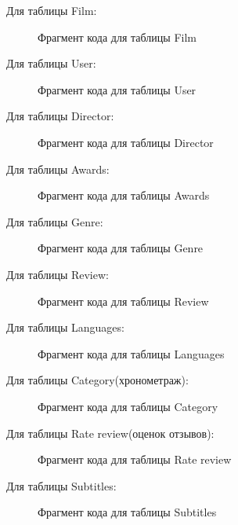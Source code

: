 Для таблицы Film:
\begin{figure} [H]
    \caption{Фрагмент кода для таблицы Film}
    \label{film}
\end{figure}

Для таблицы User:
\begin{figure} [H]
    \caption{Фрагмент кода для таблицы User}
\end{figure}

Для таблицы Director:
\begin{figure} [H]
    \caption{Фрагмент кода для таблицы Director}
\end{figure}

Для таблицы Awards:
\begin{figure} [H]
    \caption{Фрагмент кода для таблицы Awards}
\end{figure}

Для таблицы Genre:
\begin{figure} [H]
    \caption{Фрагмент кода для таблицы Genre}
\end{figure}

Для таблицы Review:
\begin{figure} [H]
    \caption{Фрагмент кода для таблицы Review}
\end{figure}

Для таблицы Languages:
\begin{figure} [H]
    \caption{Фрагмент кода для таблицы Languages}
\end{figure}

Для таблицы Category(хронометраж):
\begin{figure} [H]
    \caption{Фрагмент кода для таблицы Category}
\end{figure}

Для таблицы Rate review(оценок отзывов):
\begin{figure} [H]
    \caption{Фрагмент кода для таблицы Rate review}
\end{figure}

Для таблицы Subtitles:
\begin{figure} [H]
    \caption{Фрагмент кода для таблицы Subtitles}
\end{figure}

